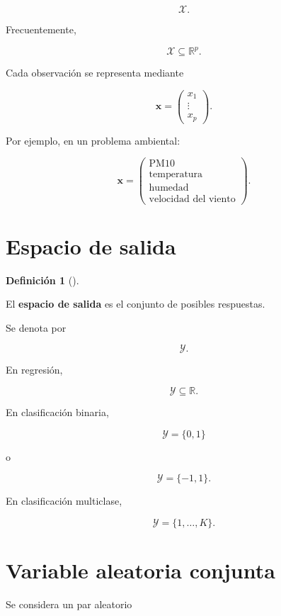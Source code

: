 \documentclass[
  spanish,
  11pt,
  letterpaper,
  DIV=11,
  numbers=noendperiod]{scrreprt}
\theoremstyle{definition}
\newtheorem{definition}{Definición}[chapter]
\theoremstyle{plain}
\theoremstyle{definition}
\theoremstyle{remark}
\begin{document}
\[
\mathcal{X}.
\]

Frecuentemente,

\[
\mathcal{X}\subseteq\mathbb{R}^{p}.
\]

Cada observación se representa mediante

\[
\mathbf{x}
=
\begin{pmatrix}
x_1\\
\vdots\\
x_p
\end{pmatrix}.
\]

Por ejemplo, en un problema ambiental:

\[
\mathbf{x}
=
\begin{pmatrix}
\text{PM10}\\
\text{temperatura}\\
\text{humedad}\\
\text{velocidad del viento}
\end{pmatrix}.
\]

\section{Espacio de salida}\label{espacio-de-salida}

\begin{definition}[]\protect\hypertarget{def-espacio-salida}{}\label{def-espacio-salida}

El \textbf{espacio de salida} es el conjunto de posibles respuestas.

\end{definition}

Se denota por

\[
\mathcal{Y}.
\]

En regresión,

\[
\mathcal{Y}\subseteq\mathbb{R}.
\]

En clasificación binaria,

\[
\mathcal{Y}=\{0,1\}
\]

o

\[
\mathcal{Y}=\{-1,1\}.
\]

En clasificación multiclase,

\[
\mathcal{Y}
=
\{1,\ldots,K\}.
\]

\section{Variable aleatoria conjunta}\label{variable-aleatoria-conjunta}

Se considera un par aleatorio
\end{document}
